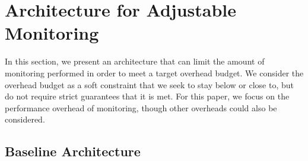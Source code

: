 \section{Architecture for Adjustable Monitoring}
\label{sec:dropping}

In this section, we present an architecture that can limit the amount of
monitoring performed in order to meet a target overhead budget. We consider the
overhead budget as a soft constraint that we seek to stay below or close to,
but do not require strict guarantees that it is met. For this paper, we focus on
the performance overhead of monitoring, though other overheads could also be
considered. 

\subsection{Baseline Architecture}

